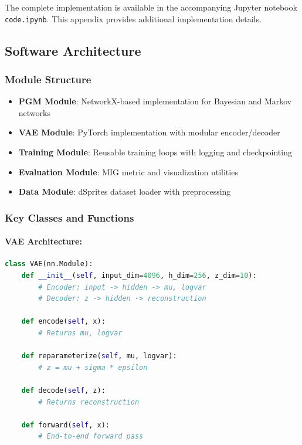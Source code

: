 \documentclass[conference]{IEEEtran}
\begin{document}
The complete implementation is available in the accompanying Jupyter notebook \texttt{code.ipynb}. This appendix provides additional implementation details.

\subsection{Software Architecture}

\subsubsection{Module Structure}
\begin{itemize}
    \item \textbf{PGM Module}: NetworkX-based implementation for Bayesian and Markov networks
    \item \textbf{VAE Module}: PyTorch implementation with modular encoder/decoder
    \item \textbf{Training Module}: Reusable training loops with logging and checkpointing
    \item \textbf{Evaluation Module}: MIG metric and visualization utilities
    \item \textbf{Data Module}: dSprites dataset loader with preprocessing
\end{itemize}

\subsubsection{Key Classes and Functions}

\paragraph{VAE Architecture:}
\begin{lstlisting}[language=Python, basicstyle=\small\ttfamily]
class VAE(nn.Module):
    def __init__(self, input_dim=4096, h_dim=256, z_dim=10):
        # Encoder: input -> hidden -> mu, logvar
        # Decoder: z -> hidden -> reconstruction
        
    def encode(self, x):
        # Returns mu, logvar
        
    def reparameterize(self, mu, logvar):
        # z = mu + sigma * epsilon
        
    def decode(self, z):
        # Returns reconstruction
        
    def forward(self, x):
        # End-to-end forward pass
\end{lstlisting}
\end{document}

